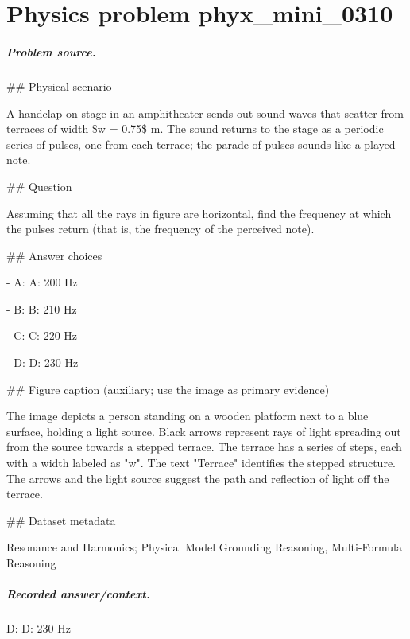 
\chapter{Physics problem phyx\_mini\_0310}
\label{ch:PhyXMiniProblems_problem_phyx_mini_0310}

\paragraph{Problem source.}
\#\# Physical scenario

A handclap on stage in an amphitheater sends out sound waves that scatter from terraces of width \$w = 0.75\$ m. The sound returns to the stage as a periodic series of pulses, one from each terrace; the parade of pulses sounds like a played note.

\#\# Question

Assuming that all the rays in figure are horizontal, find the frequency at which the pulses return (that is, the frequency of the perceived note).

\#\# Answer choices

- A: A: 200 Hz

- B: B: 210 Hz

- C: C: 220 Hz

- D: D: 230 Hz

\#\# Figure caption (auxiliary; use the image as primary evidence)

The image depicts a person standing on a wooden platform next to a blue surface, holding a light source. Black arrows represent rays of light spreading out from the source towards a stepped terrace. The terrace has a series of steps, each with a width labeled as "w". The text "Terrace" identifies the stepped structure. The arrows and the light source suggest the path and reflection of light off the terrace.

\#\# Dataset metadata

Resonance and Harmonics; Physical Model Grounding Reasoning, Multi-Formula Reasoning

\paragraph{Recorded answer/context.}
D: D: 230 Hz

